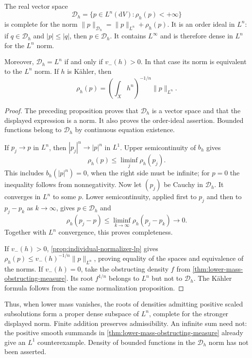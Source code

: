 \begin{proposition}\label{prop:individual-density-banach}
The real vector space
\[
 \mathcal D_h=\{p\in L^n(\mathrm{d}V):\rho_h(p)<+\infty\}
\]
is complete for the norm $\|p\|_{\mathcal D_h}=\|p\|_{L^n}+\rho_h(p)$. It is an order ideal in $L^n$: if $q\in\mathcal D_h$ and $|p|\leq|q|$, then $p\in\mathcal D_h$. It contains $L^\infty$ and is therefore dense in $L^n$ for the $L^n$ norm.

Moreover, $\mathcal D_h=L^n$ if and only if $v_-(h)>0$. In that case its norm is equivalent to the $L^n$ norm. If $h$ is K\"ahler, then
\[
 \rho_h(p)=\left(\int_Xh^n\right)^{-1/n}\|p\|_{L^n}.
\]
\end{proposition}
\begin{proof}
The preceding proposition proves that $\mathcal D_h$ is a vector space and that the displayed expression is a norm. It also proves the order-ideal assertion. Bounded functions belong to $\mathcal D_h$ by continuous equation existence.

If $p_j\to p$ in $L^n$, then $|p_j|^n\to|p|^n$ in $L^1$. Upper semicontinuity of $b_h$ gives
\[
 \rho_h(p)\leq\liminf_j\rho_h(p_j).
\]
This includes $b_h(|p|^n)=0$, when the right side must be infinite; for $p=0$ the inequality follows from nonnegativity. Now let $(p_j)$ be Cauchy in $\mathcal D_h$. It converges in $L^n$ to some $p$. Lower semicontinuity, applied first to $p_j$ and then to $p_j-p_k$ as $k\to\infty$, gives $p\in\mathcal D_h$ and
\[
 \rho_h(p_j-p)\leq\liminf_{k\to\infty}\rho_h(p_j-p_k)\longrightarrow0.
\]
Together with $L^n$ convergence, this proves completeness.

If $v_-(h)>0$, \cref{prop:individual-normalizer-lp} gives
$\rho_h(p)\leq v_-(h)^{-1/n}\|p\|_{L^n}$, proving equality of the spaces and equivalence of the norms. If $v_-(h)=0$, take the obstructing density $f$ from \cref{thm:lower-mass-obstructing-measure}. Its root $f^{1/n}$ belongs to $L^n$ but not to $\mathcal D_h$. The K\"ahler formula follows from the same normalization proposition.
\end{proof}

Thus, when lower mass vanishes, the roots of densities admitting positive scaled subsolutions form a proper dense subspace of $L^n$, complete for the stronger displayed norm. Finite addition preserves admissibility. An infinite sum need not: the positive smooth summands in \cref{thm:lower-mass-obstructing-measure} already give an $L^1$ counterexample. Density of bounded functions in the $\mathcal D_h$ norm has not been asserted.
